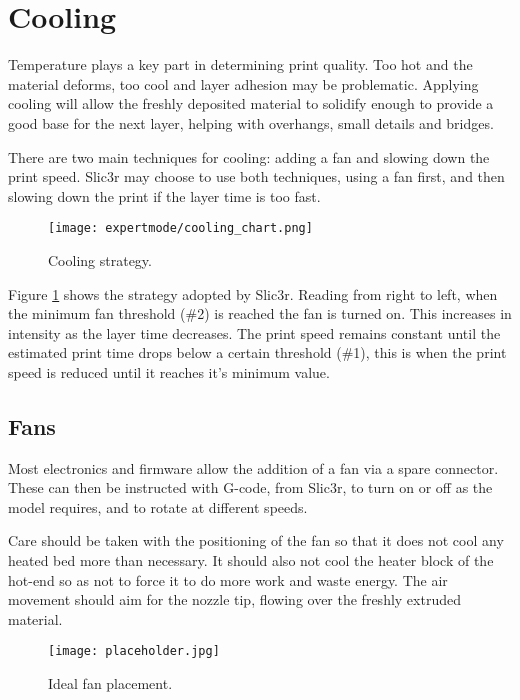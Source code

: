 
\section{Cooling} %
\label{sec:cooling}

Temperature plays a key part in determining print quality.  Too hot and the material deforms, too cool and layer adhesion may be problematic.  Applying cooling will allow the freshly deposited material to solidify enough to provide a good base for the next layer, helping with overhangs, small details and bridges.

There are two main techniques for cooling: adding a fan and slowing down the print speed.  Slic3r may choose to use both techniques, using a fan first, and then slowing down the print if the layer time is too fast.  

\begin{figure}[H]
\centering
\texttt{[image: expertmode/cooling\_chart.png]}
\caption{Cooling strategy.}
\label{fig:cooling_chart}
\end{figure}

Figure \ref{fig:cooling_chart} shows the strategy adopted by Slic3r.  Reading from right to left, when the minimum fan threshold (\#2) is reached the fan is turned on.  This increases in intensity as the layer time decreases.  The print speed remains constant until the estimated print time drops below a certain threshold (\#1), this is when the print speed is reduced until it reaches it's minimum value.

\subsection{Fans} %
\label{sub:fans}
Most electronics and firmware allow the addition of a fan via a spare connector.  These can then be instructed with G-code, from Slic3r, to turn on or off as the model requires, and to rotate at different speeds.

Care should be taken with the positioning of the fan so that it does not cool any heated bed more than necessary.  It should also not cool the heater block of the hot-end so as not to force it to do more work and waste energy.  The air movement should aim for the nozzle tip, flowing over the freshly extruded material. 

\begin{figure}[H]
\centering
\texttt{[image: placeholder.jpg]}
\caption{Ideal fan placement.}
\label{fig:ideal_fan_placement}
\end{figure}

